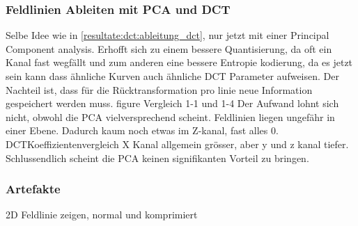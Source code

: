 \subsubsection{Feldlinien Ableiten mit PCA und DCT}
Selbe Idee wie in \ref{resultate:dct:ableitung_dct}, nur jetzt mit einer Principal Component analysis. Erhofft sich zu einem bessere Quantisierung, da oft ein Kanal fast wegfällt und zum anderen eine bessere Entropie kodierung, da es jetzt sein kann dass ähnliche Kurven auch ähnliche DCT Parameter aufweisen. Der Nachteil ist, dass für die Rücktransformation pro linie neue Information gespeichert werden muss.
figure Vergleich 1-1 und 1-4
Der Aufwand lohnt sich nicht, obwohl die PCA vielversprechend scheint. Feldlinien liegen ungefähr in einer Ebene. Dadurch kaum noch etwas im Z-kanal, fast alles 0.
DCTKoeffizientenvergleich
X Kanal allgemein grösser, aber y und z kanal tiefer. Schlussendlich scheint die PCA keinen signifikanten Vorteil zu bringen.


\subsubsection{Artefakte}
2D Feldlinie zeigen, normal und komprimiert
